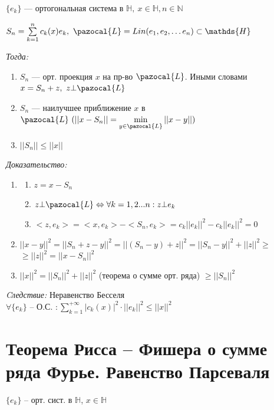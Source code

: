 \documentclass[paper=a4, fontsize=17pt]{article}
\begin{document}
$\{e_k\}$ {{---}} ортогональная система в $\mathds{H},\ x \in \mathds{H}, n \in \mathbb{N}$

$S_n = \sum\limits_{k=1}^{n} c_k(x)e_k,\ \pazocal{L} = Lin(e_1, e_2, \ldots e_n) \subset \mathds{H}$

\emph{Тогда:}

\begin{enumerate}

	\item $S_n$ {{---}} орт. проекция $x$ на пр-во $\pazocal{L}$. Иными словами $x = S_n + z,\ z \bot \pazocal{L}$

	\item $S_n$ {{---}} наилучшее приближение $x$ в $\pazocal{L}\ (||x - S_n|| = \min\limits_{y \in \pazocal{L}} ||x - y||)$

	\item $||S_n|| \leqslant ||x||$

\end{enumerate}

\emph{Доказательство:}

\begin{enumerate}

	\item
	\begin{enumerate}
		\item $z = x - S_n$

		\item $z \bot \pazocal{L} \Leftrightarrow \forall k = 1, 2 ...n : z \bot e_k$

		\item $<z, e_k> = <x, e_k> - <S_n, e_k> = c_k ||e_k||^2 - c_k ||e_k||^2 = 0$
	\end{enumerate}

	\item $||x - y||^2 = ||S_n + z - y||^2 = ||(S_n - y) + z||^2 = ||S_n - y||^2 + ||z||^2 \geqslant$ $\geqslant ||z||^2 = ||x - S_n||^2$

	\item $||x||^2 = ||S_n||^2 + ||z||^2$ (теорема о сумме орт. ряда) $\geqslant ||S_n||^2$
\end{enumerate}

\emph{Cледствие:} Неравенство Бесселя\\

$\forall \{e_k\}$ {{--}} О.С. $:\sum\limits_{k=1}^{+\infty} |c_k(x)|^2 \cdot ||e_k||^2 \leqslant ||x||^2$

\section{Теорема Рисса -- Фишера о сумме ряда Фурье. Равенство Парсеваля}
$\{e_k\}$ -- орт. сист. в $\mathds{H}$, $x \in \mathds{H}$\\
\end{document}
